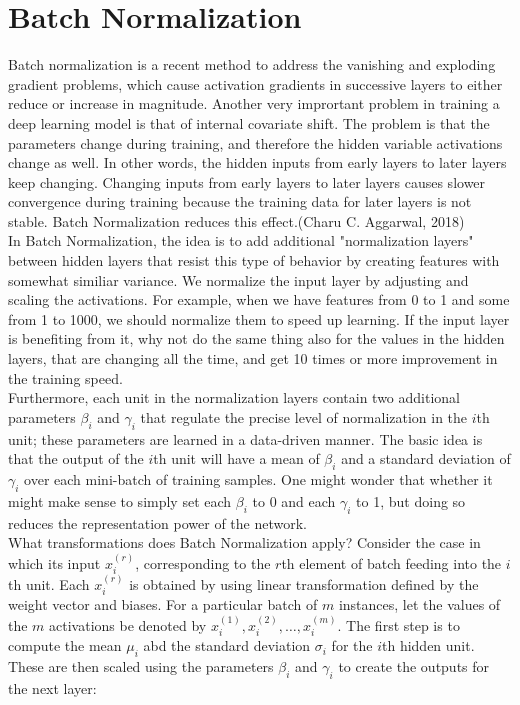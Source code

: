 \documentclass[11pt]{article}
\begin{document}
\section{Batch Normalization}
\hspace*{1cm} Batch normalization is a recent method to address the vanishing and exploding gradient problems, which cause activation gradients in
successive layers to either reduce or increase in magnitude. Another very imprortant problem in training a deep learning model is that of internal covariate shift. The problem is that the parameters change during training, and therefore the hidden variable activations change as well. In other words, the hidden inputs from early layers to later layers keep changing. Changing inputs from early layers to later layers causes slower convergence during training because the training data for later layers is not stable. Batch Normalization reduces this effect.(Charu C. Aggarwal, 2018) \\
In Batch Normalization, the idea is to add additional "normalization layers" between hidden layers that resist this type of behavior by creating features with somewhat similiar variance. We normalize the input layer by adjusting and scaling the activations. For example, when we have features from 0 to 1 and some from 1 to 1000, we should normalize them to speed up learning. If the input layer is benefiting from it, why not do the same thing also for the values in the hidden layers, that are changing all the time, and get 10 times or more improvement in the training speed. \cite{ioffe2015batch} 
\\
Furthermore, each unit in the normalization layers contain two additional parameters $\beta_i$ and $\gamma_i$ that regulate the precise level of normalization in the $i$th unit; these parameters are learned in a data-driven manner. The basic idea is that the output of the $i$th unit will have a mean of $\beta_i$ and a standard deviation of $\gamma_i$ over each mini-batch of training samples. One might wonder that whether it might make sense to simply set each $\beta_i$ to 0 and each $\gamma_i$ to 1, but doing so reduces the representation power of the network.\\
What transformations does Batch Normalization apply? Consider the case in which its input $x_{i}^{(r)}$, corresponding to the $r$th element of batch feeding into the $i$th unit. Each $x_{i}^{(r)}$ is obtained by using linear transformation defined by the weight vector and biases. For a particular batch of $m$ instances, let the values of the $m$ activations be denoted by 
$x_{i}^{(1)}, x_{i}^{(2)}, \dots, x_{i}^{(m)}$. The first step is to compute the mean $\mu_i$ abd the standard deviation $\sigma_i$ for the $i$th hidden unit. These are then scaled using the parameters $\beta_i$ and $\gamma_i$ to create the outputs for the next layer:
\end{document}
